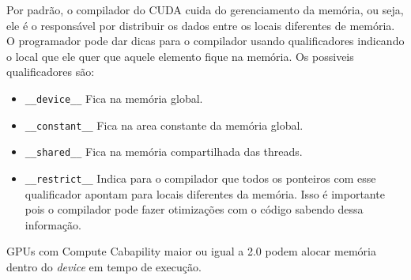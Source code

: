 Por padrão, o compilador do CUDA cuida do gerenciamento da memória, ou seja, ele é o responsável por distribuir os dados 
entre os locais diferentes de memória. O programador pode dar dicas para o compilador usando qualificadores indicando o local
que ele quer que aquele elemento fique na memória. Os possiveis qualificadores são:
\begin{itemize}
  \item \verb#__device__# Fica na memória global.
  \item \verb#__constant__#   Fica na area constante da memória global.
  \item \verb#__shared__# Fica na memória compartilhada das threads.
  \item \verb#__restrict__# Indica para o compilador que todos os ponteiros com esse qualificador apontam para locais diferentes
                            da memória. Isso é importante pois o compilador pode fazer otimizações com o código sabendo dessa informação.   
\end{itemize}

GPUs com Compute Cabapility maior ou igual a 2.0 podem alocar memória dentro do \textit{device} em tempo de execução.
